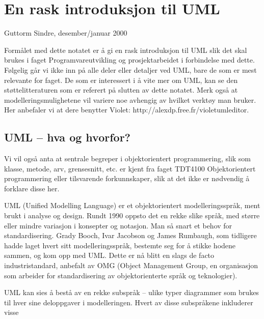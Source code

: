 \section{En rask introduksjon til UML}
Guttorm Sindre, desember/januar 2000

Formålet med dette notatet er å gi en rask introduksjon til UML slik det skal brukes i faget Programvareutvikling og prosjektarbeidet i forbindelse med dette. Følgelig går vi ikke inn på alle deler eller detaljer ved UML, bare de som er mest relevante for faget. De som er interessert i å vite mer om UML, kan se den støttelitteraturen som er referert på slutten av dette notatet. Merk også at modelleringsmulighetene vil variere noe avhengig av hvilket verktøy man bruker. Her anbefaler vi at dere benytter Violet: http://alexdp.free.fr/violetumleditor.

\subsection{UML – hva og hvorfor?}
Vi vil også anta at sentrale begreper i objektorientert programmering, slik som klasse, metode, arv, grensesnitt, etc. er kjent fra faget TDT4100 Objektorientert programmering eller tilsvarende forkunnskaper, slik at det ikke er nødvendig å forklare disse her.

UML (Unified Modelling Language) er et objektorientert modelleringsspråk, ment brukt i analyse og design. Rundt 1990 oppsto det en rekke slike språk, med større eller mindre variasjon i konsepter og notasjon. Man så snart et behov for standardisering. Grady Booch, Ivar Jacobson og James Rumbaugh, som tidligere hadde laget hvert sitt modelleringsspråk, bestemte seg for å stikke hodene sammen, og kom opp med UML. Dette er nå blitt en slags de facto industristandard, anbefalt av OMG (Object Management Group, en organisasjon som arbeider for standardisering av objektorienterte språk og teknologier).

UML kan sies å bestå av en rekke subspråk – ulike typer diagrammer som brukes til hver sine deloppgaver i modelleringen. Hvert av disse subspråkene inkluderer visse


